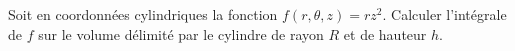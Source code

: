 
\begin{exercice}\label{exoOutilsMath-0135}

    Soit en coordonnées cylindriques la fonction \( f(r,\theta,z)=rz^2\). Calculer l'intégrale de \( f\) sur le volume délimité par le cylindre de rayon \( R\) et de hauteur \( h\).

\end{exercice}
